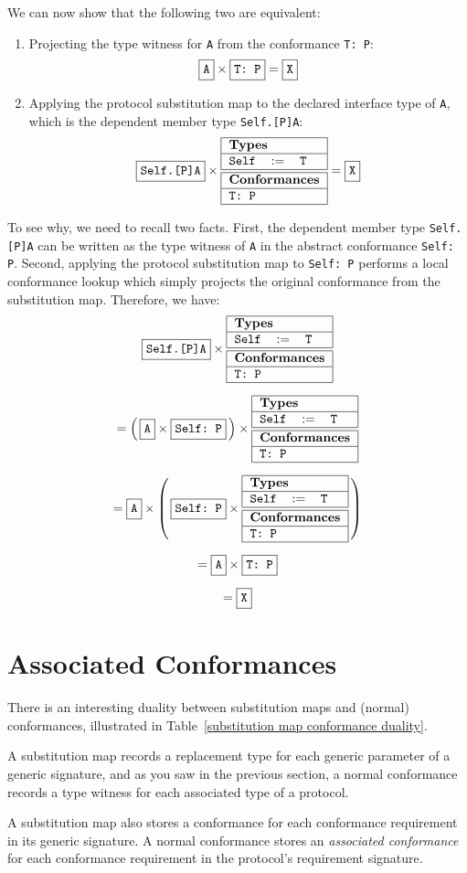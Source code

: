 \documentclass[a4paper,headsepline,bibliography=totoc,toc=flat,fleqn,twoside=semi]{scrbook}
\theoremstyle{definition}
\theoremstyle{definition}
\theoremstyle{definition}
\newcommand{\ttbox}[1]{\boxed{\mbox{\vphantom{pI\texttt{pI}}\texttt{#1}}}}
\newcommand{\SubMapC}[2]{\begin{tabular}{|lll|}
\hline
\multicolumn{3}{|l|}{\textbf{Types}}\\
\hline
#1\\
\hline
\hline
\multicolumn{3}{|l|}{\textbf{Conformances}}\\
\hline
#2\\
\hline
\end{tabular}}
\newcommand{\SubType}[2]{\texttt{#1}&$:=$&\texttt{#2}}
\newcommand{\SubConf}[1]{\multicolumn{3}{|l|}{\texttt{#1}}}
\begin{document}
We can now show that the following two are equivalent:
\begin{enumerate}
\item Projecting the type witness for \texttt{A} from the conformance \verb|T: P|:
\[\ttbox{A} \times \ttbox{T:\ P} = \ttbox{X}\]
\item Applying the protocol substitution map to the declared interface type of \texttt{A}, which is the dependent member type \texttt{Self.[P]A}:
\[\ttbox{Self.[P]A} \times \SubMapC{
\SubType{Self}{T}
}{
\SubConf{T:\ P}
} = \ttbox{X}\]
\end{enumerate}
To see why, we need to recall two facts. First, the dependent member type \texttt{Self.[P]A} can be written as the type witness of \texttt{A} in the abstract conformance \verb|Self: P|. Second, applying the protocol substitution map to \verb|Self: P| performs a local conformance lookup which simply projects the original conformance from the substitution map. Therefore, we have:
\begin{gather*}
\ttbox{Self.[P]A} \times \SubMapC{
\SubType{Self}{T}
}{
\SubConf{T:\ P}
}\\[\medskipamount]
= \left(\,\ttbox{A} \times \ttbox{Self:\ P}\,\right) \times \SubMapC{
\SubType{Self}{T}
}{
\SubConf{T:\ P}
}\\[\medskipamount]
= \ttbox{A} \times \left(\,\ttbox{Self:\ P} \times \SubMapC{
\SubType{Self}{T}
}{
\SubConf{T:\ P}
}\,\right)\\[\medskipamount]
= \ttbox{A} \times \ttbox{T:\ P}\\[\medskipamount]
= \ttbox{X}
\end{gather*}

\section{Associated Conformances}\label{associated conformances}
There is an interesting duality between substitution maps and (normal) conformances, illustrated in Table~\ref{substitution map conformance duality}.

A substitution map records a replacement type for each generic parameter of a generic signature, and as you saw in the previous section, a normal conformance records a type witness for each associated type of a protocol.

A substitution map also stores a conformance for each conformance requirement in its generic signature. A normal conformance stores an \emph{associated conformance} for each conformance requirement in the protocol's requirement signature.
\end{document}
